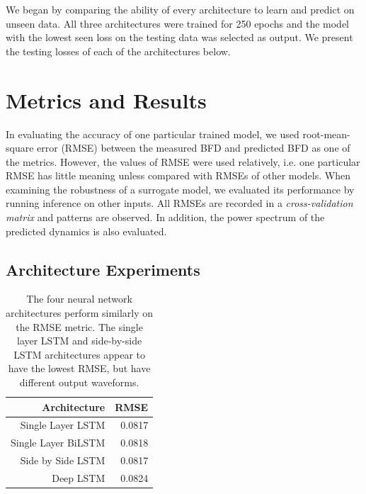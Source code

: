 We began by comparing the ability of every architecture to learn and predict on unseen data.
All three architectures were trained for 250 epochs and the model with the lowest seen loss on the testing data was selected as output.
We present the testing losses of each of the architectures below.

\section{Metrics and Results} \label{ch:exp:results}

In evaluating the accuracy of one particular trained model, we used root-mean-square error (RMSE) between the measured BFD and predicted BFD as one of the metrics. However, the values of RMSE were used relatively, i.e. one particular RMSE has little meaning unless compared with RMSEs of other models. When examining the robustness of a surrogate model, we evaluated its performance by running inference on other inputs. All RMSEs are recorded in a \emph{cross-validation matrix} and patterns are observed. In addition, the power spectrum of the predicted dynamics is also evaluated. 

\subsection{Architecture Experiments}

\begin{table}[t!]
    \centering
    \begin{tabular}{r r}
         Architecture & RMSE \\ \hline
         Single Layer LSTM & 0.0817\\
         Single Layer BiLSTM & 0.0818\\
         Side by Side LSTM & 0.0817 \\
         Deep LSTM & 0.0824 \\ \hline
    \end{tabular}
    \caption{The four neural network architectures perform similarly on the RMSE metric. The single layer LSTM and side-by-side LSTM architectures appear to have the lowest RMSE, but have different output waveforms.}
    \label{tab:rmse_error}
\end{table}

